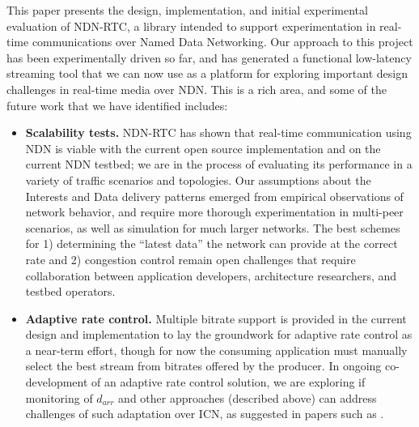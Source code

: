 \documentclass{icn/sig-alternate-2013} %
\newcommand{\ndnrtcName}{NDN-RTC} %
\begin{document}
This paper presents the design, implementation, and initial experimental evaluation of \ndnrtcName{}, a library intended to support experimentation in real-time communications over Named Data Networking.   Our approach to this project has been experimentally driven so far, and has generated a functional low-latency streaming tool that we can now use as a platform for exploring important design challenges in real-time media over NDN.  This is a rich area, and some of the future work that we have identified includes: 
\begin{itemize}[label={}]

\item \textbf{Scalability tests.} \ndnrtcName{} has shown that real-time communication using NDN is viable with the current open source implementation and on the current NDN testbed;  we are in the process of evaluating its performance in a variety of traffic scenarios and topologies. Our assumptions about the Interests and Data delivery patterns emerged from empirical observations of network behavior, and require more thorough experimentation in multi-peer scenarios, as well as simulation for much larger networks.  The best schemes for 1) determining the ``latest data'' the network can provide at the correct rate and 2) congestion control remain open challenges that require collaboration between application developers, architecture researchers, and testbed operators.


\item \textbf{Adaptive rate control.} Multiple bitrate support is provided in the current design and implementation to lay the groundwork for adaptive rate control as a near-term effort, though for now the consuming application must manually select the best stream from bitrates offered by the producer.  In ongoing co-development of an adaptive rate control solution, we are exploring if monitoring of $d_{arr}$ and other approaches (described above) can address challenges of such adaptation over ICN, as suggested in papers such as \cite{posch2014client}.  



\end{itemize}
\end{document}
